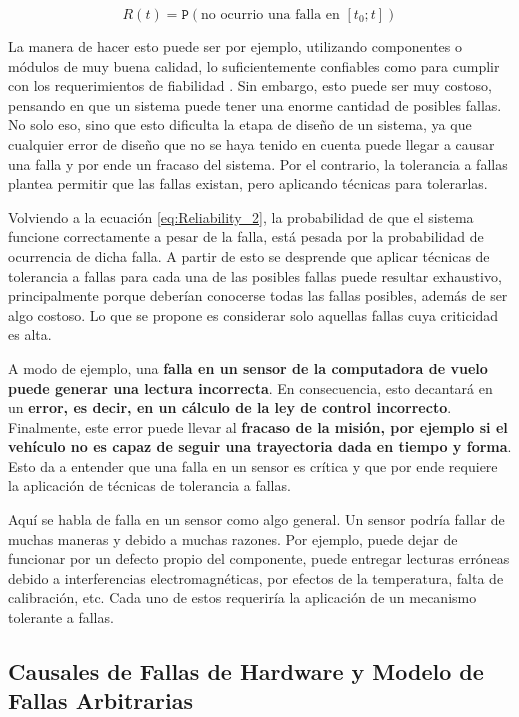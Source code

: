\begin{equation}
    R(t) = \mathtt{P}\left( \text{no ocurrio una falla en $[t_0;t]$} \right)
    \label{eq:Reliability_3}
\end{equation}

La manera de hacer esto puede ser por ejemplo, utilizando componentes o módulos de muy buena calidad, lo suficientemente confiables como para cumplir con los requerimientos de fiabilidad \cite{nelson1990fault}. Sin embargo, esto puede ser muy costoso, pensando en que un sistema puede tener una enorme cantidad de posibles fallas. No solo eso, sino que esto dificulta la etapa de diseño de un sistema, ya que cualquier error de diseño que no se haya tenido en cuenta puede llegar a causar una falla y por ende un fracaso del sistema. Por el contrario, la tolerancia a fallas plantea permitir que las fallas existan, pero aplicando técnicas para tolerarlas.

Volviendo a la ecuación \eqref{eq:Reliability_2}, la probabilidad de que el sistema funcione correctamente a pesar de la falla, está pesada por la probabilidad de ocurrencia de dicha falla. A partir de esto se desprende que aplicar técnicas de tolerancia a fallas para cada una de las posibles fallas puede resultar exhaustivo, principalmente porque deberían conocerse todas las fallas posibles, además de ser algo costoso. Lo que se propone es considerar solo aquellas fallas cuya criticidad es alta.

A modo de ejemplo, una \textbf{falla en un sensor de la computadora de vuelo puede generar una lectura incorrecta}. En consecuencia, esto decantará en un \textbf{error, es decir, en un cálculo de la ley de control incorrecto}. Finalmente, este error puede llevar al \textbf{fracaso de la misión, por ejemplo si el vehículo no es capaz de seguir una trayectoria dada en tiempo y forma}. Esto da a entender que una falla en un sensor es crítica y que por ende requiere la aplicación de técnicas de tolerancia a fallas.

Aquí se habla de falla en un sensor como algo general. Un sensor podría fallar de muchas maneras y debido a muchas razones. Por ejemplo, puede dejar de funcionar por un defecto propio del componente, puede entregar lecturas erróneas debido a interferencias electromagnéticas, por efectos de la temperatura, falta de calibración, etc. Cada uno de estos requeriría la aplicación de un mecanismo tolerante a fallas.

\subsection{Causales de Fallas de Hardware y Modelo de Fallas Arbitrarias}

